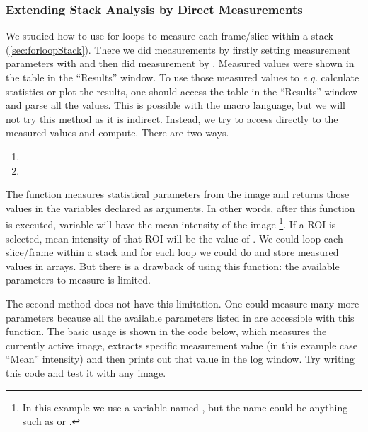 
\subsubsection{Extending Stack Analysis by Direct Measurements}

We studied how to use for-loops to measure each frame/slice within a stack (\ref{sec:forloopStack}). There we did measurements by firstly setting measurement parameters with  and then did measurement by . Measured values were shown in the table in the ``Results'' window. To use those measured values to \textit{e.g.} calculate statistics or plot the results, one should access the table in the ``Results'' window and parse all the values. This is possible with the macro language, but we will not try this method as it is indirect. Instead, we try to access directly to the measured values and compute. There are two ways. 

\begin{enumerate}
\item {}
\item {}
\end{enumerate}
The function  measures statistical parameters from the image and returns those values in the variables declared as arguments. In other words, after this function is executed, variable  will have the mean intensity of the image
\footnote{In this example we use a variable named , but the name could be anything such as  or .}. 
If a ROI is selected, mean intensity of that ROI will be the value of . We could loop each slice/frame within a stack and for each loop we could do  and store measured values in arrays. But there is a drawback of using this function: the available parameters to measure is limited. 

The second method  does not have this limitation. One could measure many more parameters because all the available parameters listed in  are accessible with this function. The basic usage is shown in the code below, which measures the currently active image, extracts specific measurement value (in this example case ``Mean'' intensity) and then prints out that value in the log window. Try writing this code and test it with any image. 

